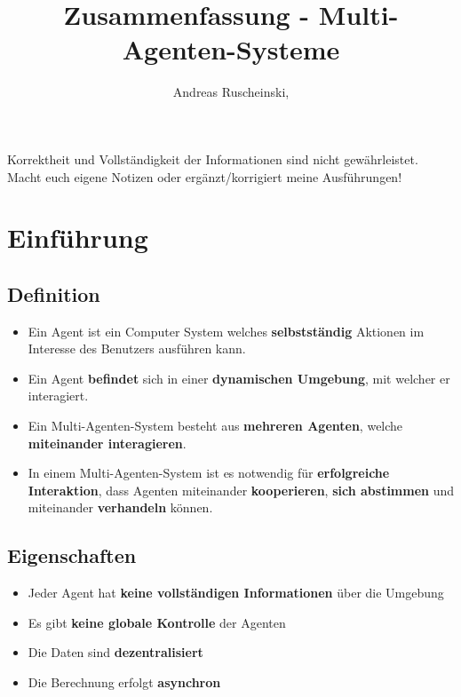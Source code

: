 \documentclass{article} %
\title{Zusammenfassung - Multi-Agenten-Systeme}
\author{
	Andreas Ruscheinski,
}
\begin{document}
\maketitle
\begin{framed}Korrektheit und Vollständigkeit der Informationen sind nicht gewährleistet.
Macht euch eigene Notizen oder ergänzt/korrigiert meine Ausführungen!
\end{framed}
\setcounter{tocdepth}{1}
\tableofcontents

\section{Einführung}
	\subsection{Definition}
	\begin{itemize}
		\item Ein Agent ist ein Computer System welches \textbf{selbstständig} Aktionen im Interesse des Benutzers ausführen kann.
		\item Ein Agent \textbf{befindet} sich in einer \textbf{dynamischen Umgebung}, mit welcher er interagiert.
		\item Ein Multi-Agenten-System besteht aus \textbf{mehreren Agenten}, welche \textbf{miteinander interagieren}.
		\item In einem Multi-Agenten-System ist es notwendig für \textbf{erfolgreiche Interaktion}, dass Agenten miteinander \textbf{kooperieren},\textbf{ sich abstimmen} und miteinander \textbf{verhandeln} können.
	\end{itemize}
	\subsection{Eigenschaften}
	\begin{itemize}
		\item Jeder Agent hat \textbf{keine vollständigen Informationen} über die Umgebung
		\item Es gibt \textbf{keine globale Kontrolle} der Agenten
		\item Die Daten sind \textbf{dezentralisiert}
		\item Die Berechnung erfolgt \textbf{asynchron}
	\end{itemize}
\end{document}
